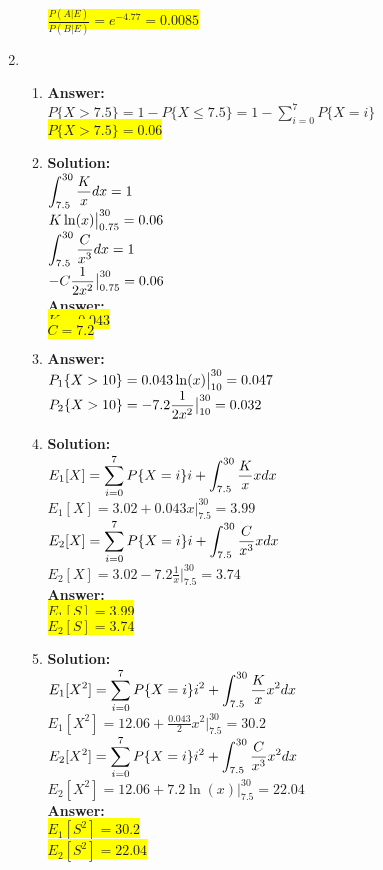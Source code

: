 \documentclass{article}
\newcommand{\myansw}{\textbf{Answer:}\\}
\newcommand{\mysolu}{\textbf{Solution:}\\}
\begin{document}
\begin{enumerate}
\begin{enumerate}
		\colorbox{yellow}{${\frac{P(A|E)}{P(B|E)} = e^{-4.77} = 0.0085}$}\\
		
	\end{enumerate}

	\item 
	\begin{enumerate}
		\item
		\myansw
		${P\{X > 7.5\} = 1 - P\{X \leq 7.5\} = 1 -\sum\limits_{i = 0}^{7}P\{X = i\}}$\\
		\colorbox{yellow}{$P\{X > 7.5\} = 0.06 $}\\
		\item
		\mysolu
		${\mathlarger{\int_{7.5}^{30}\frac{K}{x}dx = 1}}$\\
		${\mathlarger{K\ln(x)\big|_{0.75}^{30} = 0.06}}$\\
		${\mathlarger{\int_{7.5}^{30}\frac{C}{x^3}dx = 1}}$\\
		${\mathlarger{-C\frac{1}{2x^2}\big|_{0.75}^{30} = 0.06}}$\\
		\myansw
		\colorbox{yellow}{$K = 0.043$}\\
		\colorbox{yellow}{$C = 7.2$}\\
		\item
		\myansw
		${\mathlarger{P_1\{X > 10\} = 0.043\ln(x)\big|_{10}^{30}=0.047}}$\\
		${\mathlarger{P_2\{X > 10\} = -7.2\frac{1}{2x^2}\big|_{10}^{30}=0.032}}$\\
		\item
		\mysolu
		${\mathlarger{E_1[X] =\sum\limits_{i = 0}^{7}P\{X = i\}i + \int_{7.5}^{30}\frac{K}{x}xdx }}$\\
		${E_1[X] = 3.02 + 0.043x\big|_{7.5}^{30} = 3.99 }$\\
		${\mathlarger{E_2[X] =\sum\limits_{i = 0}^{7}P\{X = i\}i + \int_{7.5}^{30}\frac{C}{x^3}xdx }}$\\
		${E_2[X] = 3.02 -7.2\frac{1}{x}\big|_{7.5}^{30} = 3.74 }$\\
		\myansw
		\colorbox{yellow}{${E_1[S] = 3.99 }$}\\
		\colorbox{yellow}{${E_2[S] = 3.74 }$}\\
				\item
		\mysolu
		${\mathlarger{E_1[X^2] =\sum\limits_{i = 0}^{7}P\{X = i\}i^2 + \int_{7.5}^{30}\frac{K}{x}x^2dx }}$\\
		${E_1[X^2] = 12.06 + \frac{0.043}{2}x^2\big|_{7.5}^{30} = 30.2 }$\\
		${\mathlarger{E_2[X^2] =\sum\limits_{i = 0}^{7}P\{X = i\}i^2 + \int_{7.5}^{30}\frac{C}{x^3}x^2dx }}$\\
		${E_2[X^2] = 12.06 +7.2\ln(x)\big|_{7.5}^{30} = 22.04 }$\\
		\myansw
		\colorbox{yellow}{${E_1[S^2] = 30.2 }$}\\
		\colorbox{yellow}{${E_2[S^2] = 22.04 }$}\\
		
		
	\end{enumerate}
	

	
	
	
	
	
\end{enumerate}


\newpage
\end{document}
